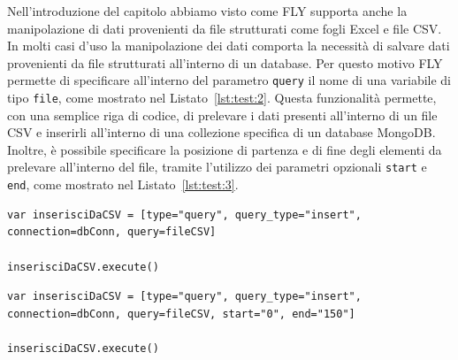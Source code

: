 Nell'introduzione del capitolo abbiamo visto come FLY supporta anche la manipolazione di dati provenienti da file strutturati come fogli Excel e file CSV. In molti casi d'uso la manipolazione dei dati comporta la necessità di salvare dati provenienti da file strutturati all'interno di un database. Per questo motivo FLY permette di specificare all'interno del parametro \verb|query| il nome di una variabile di tipo \verb|file|, come mostrato nel Listato~\ref{lst:test:2}. Questa funzionalità permette, con una semplice riga di codice, di prelevare i dati presenti all'interno di un file CSV e inserirli all'interno di una collezione specifica di un database MongoDB. Inoltre, è possibile specificare la posizione di partenza e di fine degli elementi da prelevare all'interno del file, tramite l'utilizzo dei parametri opzionali \verb|start| e \verb|end|, come mostrato nel Listato~\ref{lst:test:3}. \\
\begin{lstlisting}[language=FLY,caption={Dichiarazione di entità query per l'inserimento degli elementi provenienti da un file CSV.}, label={lst:test:2}]
var inserisciDaCSV = [type="query", query_type="insert", connection=dbConn, query=fileCSV]

inserisciDaCSV.execute()
\end{lstlisting}  
\begin{lstlisting}[language=FLY,caption={Dichiarazione di entità query per l'inserimento dei primi 150 elementi provenienti da un file CSV.}, label={lst:test:3}]
var inserisciDaCSV = [type="query", query_type="insert", connection=dbConn, query=fileCSV, start="0", end="150"]

inserisciDaCSV.execute()
\end{lstlisting} 

